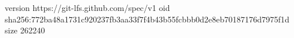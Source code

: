 version https://git-lfs.github.com/spec/v1
oid sha256:772ba48a1731c920237fb3aa33f7f4b43b55fcbbb0d2e8eb70187176d7975f1d
size 262240
